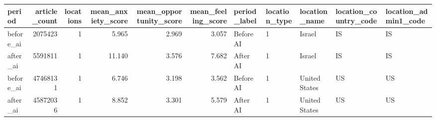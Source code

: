 \begin{tabular}{lrrrrrlllll}
\toprule
period & article\_count & locations & mean\_anxiety\_score & mean\_opportunity\_score & mean\_feeling\_score & period\_label & location\_type & location\_name & location\_country\_code & location\_admin1\_code \\
\midrule
before\_ai & 2075423 & 1 & 5.965 & 2.969 & 3.057 & Before AI & 1 & Israel & IS & IS \\
after\_ai & 5591811 & 1 & 11.140 & 3.576 & 7.682 & After AI & 1 & Israel & IS & IS \\
before\_ai & 47468131 & 1 & 6.746 & 3.198 & 3.562 & Before AI & 1 & United States & US & US \\
after\_ai & 45872036 & 1 & 8.852 & 3.301 & 5.579 & After AI & 1 & United States & US & US \\
\bottomrule
\end{tabular}
